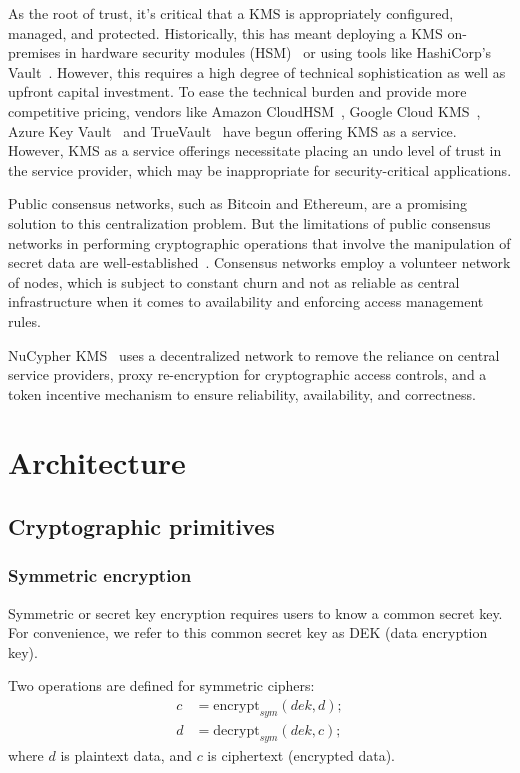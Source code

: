 \documentclass[notitlepage,longbibliography]{revtex4-1}
\newcommand{\kms}{NuCypher KMS}
\begin{document}
As the root of trust, it's critical that a KMS is appropriately configured, managed, and protected.
Historically, this has meant deploying a KMS on-premises in hardware security modules (HSM)~\cite{wiki:hsm} or using tools like
HashiCorp's Vault~\cite{web:hashicorp-vault}.
However, this requires a high degree of technical sophistication as well as upfront capital investment.
To ease the technical burden and provide more competitive pricing, vendors like Amazon CloudHSM~\cite{web:aws-cloudhsm},
Google Cloud KMS~\cite{web:google-cloud-kms}, Azure Key Vault~\cite{web:azure-key-vault} and TrueVault~\cite{web:truevault}
have begun offering KMS as a service.
However, KMS as a service offerings necessitate placing an undo level of trust in the service provider, which may
be inappropriate for security-critical applications.

Public consensus networks, such as Bitcoin and Ethereum, are a promising solution to this centralization problem.
But the limitations of public consensus networks in performing cryptographic operations that involve the manipulation of secret
data are well-established~\cite{cryptoeprint:2017:201}. Consensus networks employ a volunteer network of nodes,
which is subject to constant churn and not as reliable as central infrastructure when it comes to availability and
enforcing access management rules.

\kms~ uses a decentralized network to remove the reliance on central service providers, proxy re-encryption for cryptographic
access controls, and a token incentive mechanism to ensure reliability, availability, and correctness.

\section{Architecture}

\subsection{Cryptographic primitives}

\subsubsection{Symmetric encryption}

Symmetric or secret key encryption requires users to know a common secret key.
For convenience, we refer to this common secret key as DEK (data encryption key).

Two operations are defined for symmetric ciphers:
\begin{align}
    c &= \text{encrypt}_{sym}(dek, d);\\
    d &= \text{decrypt}_{sym}(dek, c);
\end{align}
where $d$ is plaintext data, and $c$ is ciphertext (encrypted data).
\end{document}
